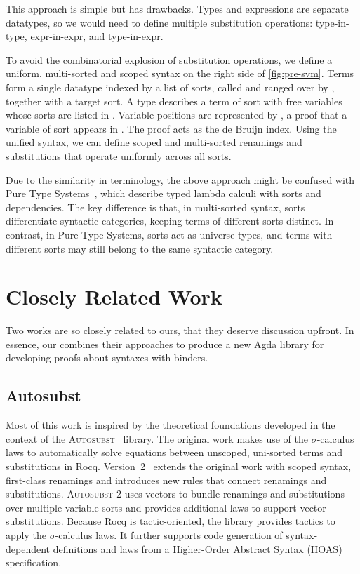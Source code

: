 \documentclass[screen,nonacm]{acmart}
\begin{document}
This approach is simple but has drawbacks. Types and expressions are separate
datatypes, so we would need to define multiple substitution operations:
type-in-type, expr-in-expr, and type-in-expr.

To avoid the combinatorial explosion of substitution operations, we define a
uniform, multi-sorted and scoped syntax on the right side of
\cref{fig:pre-svm}. Terms form a single datatype indexed by a list of sorts,
called  and ranged over by , together with a
target sort. A type    describes a
term of sort  with free variables whose sorts are listed in
. Variable positions are represented by 
 , a proof that a variable of sort 
appears in . The proof acts as the de Bruijn index. Using the
unified syntax, we can define scoped and multi-sorted renamings and
substitutions that operate uniformly across all sorts.

Due to the similarity in terminology, the above approach might be confused with
Pure Type Systems~\cite{berardi1988towards, 10.1007/3-540-52592-0_53,
      terlouw1989een}, which describe typed lambda calculi with sorts and
dependencies. The key difference is that, in multi-sorted syntax, sorts
differentiate syntactic categories, keeping terms of different sorts distinct.
In contrast, in Pure Type Systems, sorts act as universe types, and terms with
different sorts may still belong to the same syntactic category.

\section{Closely Related Work}\label{sec:rel}
Two works are so closely related to ours, that they deserve discussion upfront.
In essence, our combines their approaches to produce a new Agda library for
developing proofs about syntaxes with binders.

\subsection{Autosubst}
Most of this work is inspired by the theoretical foundations developed in the
context of the \textsc{Autosubst}~\cite{schafer2015autosubst} library. The
original work makes use of the $σ$-calculus laws to automatically solve
equations between unscoped, uni-sorted terms and substitutions in Rocq.
Version~2~\cite{10.1145/3293880.3294101, Stark:2020:Mechanising} extends the
original work with scoped syntax, first-class renamings and introduces new
rules that connect renamings and substitutions. \textsc{Autosubst 2} uses
vectors to bundle renamings and substitutions over multiple variable sorts and
provides additional laws to support vector substitutions. Because Rocq is
tactic-oriented, the library provides tactics to apply the $σ$-calculus laws.
It further supports code generation of syntax-dependent definitions and laws
from a Higher-Order Abstract Syntax (HOAS) specification.
\end{document}

